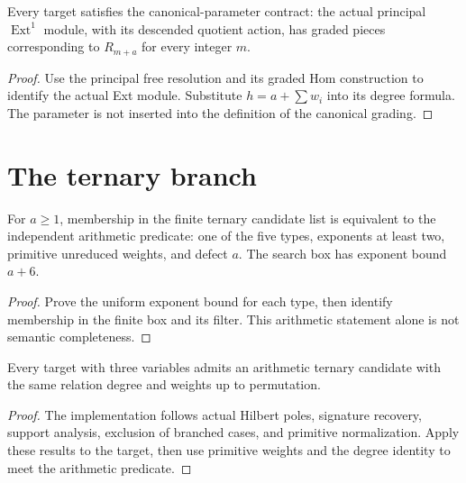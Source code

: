 \begin{theorem}
\label{thm:canonical}
\leanok
Every target satisfies the canonical-parameter contract: the actual principal $\operatorname{Ext}^1$ module, with its descended quotient action, has graded pieces corresponding to $R_{m+a}$ for every integer $m$.
\end{theorem}
\begin{proof}
\leanok
{}
Use the principal free resolution and its graded Hom construction to identify the actual Ext module. Substitute $h=a+\sum w_i$ into its degree formula. The parameter is not inserted into the definition of the canonical grading.
\end{proof}

\section{The ternary branch}

\begin{theorem}
\label{thm:ternary-enum}
\leanok
For $a\geq1$, membership in the finite ternary candidate list is equivalent to the independent arithmetic predicate: one of the five types, exponents at least two, primitive unreduced weights, and defect $a$. The search box has exponent bound $a+6$.
\end{theorem}
\begin{proof}
\leanok
{}
Prove the uniform exponent bound for each type, then identify membership in the finite box and its filter. This arithmetic statement alone is not semantic completeness.
\end{proof}

\begin{theorem}
\label{thm:ternary-reduction}
\leanok
Every target with three variables admits an arithmetic ternary candidate with the same relation degree and weights up to permutation.
\end{theorem}
\begin{proof}
\leanok
{}
The implementation follows actual Hilbert poles, signature recovery, support analysis, exclusion of branched cases, and primitive normalization. Apply these results to the target, then use primitive weights and the degree identity to meet the arithmetic predicate.
\end{proof}

